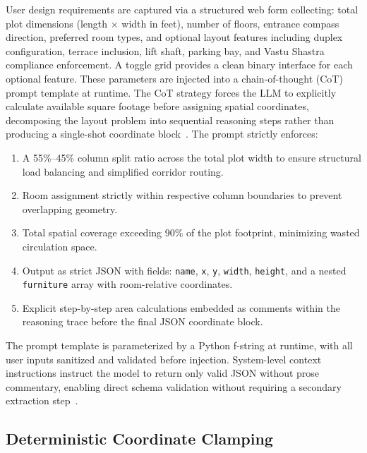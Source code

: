 \documentclass[10pt, twocolumn, letterpaper]{article}
\begin{document}
User design requirements are captured via a structured web form collecting:
total plot dimensions (length $\times$ width in feet), number of floors,
entrance compass direction, preferred room types, and optional layout features
including duplex configuration, terrace inclusion, lift shaft, parking bay,
and Vastu Shastra compliance enforcement. A toggle grid provides a clean binary
interface for each optional feature. These parameters are injected into a
chain-of-thought (CoT) prompt template at runtime. The CoT strategy forces
the LLM to explicitly calculate available square footage before assigning
spatial coordinates, decomposing the layout problem into sequential reasoning
steps rather than producing a single-shot coordinate block~\cite{cot_prompting}.
The prompt strictly enforces:
\begin{enumerate}[leftmargin=*, label=\arabic*., itemsep=0pt, topsep=2pt]
  \item A 55\%--45\% column split ratio across the total plot width to ensure
        structural load balancing and simplified corridor routing.
  \item Room assignment strictly within respective column boundaries to prevent
        overlapping geometry.
  \item Total spatial coverage exceeding 90\% of the plot footprint, minimizing
        wasted circulation space.
  \item Output as strict JSON with fields: \texttt{name}, \texttt{x},
        \texttt{y}, \texttt{width}, \texttt{height}, and a nested
        \texttt{furniture} array with room-relative coordinates.
  \item Explicit step-by-step area calculations embedded as comments within
        the reasoning trace before the final JSON coordinate block.
\end{enumerate}

The prompt template is parameterized by a Python f-string at runtime, with
all user inputs sanitized and validated before injection. System-level context
instructions instruct the model to return only valid JSON without prose
commentary, enabling direct schema validation without requiring a secondary
extraction step~\cite{json_structured_output}.

\subsection{Deterministic Coordinate Clamping}
\end{document}
